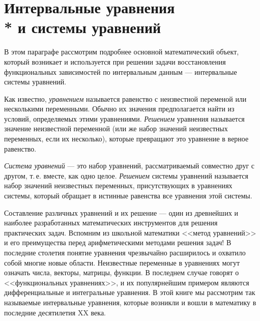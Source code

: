 \documentclass[a5paper,openany]{book}
\begin{document}
  
\section[Интервальные уравнения и системы уравнений]%
        {Интервальные уравнения\\* и системы уравнений} 
\label{InteSystemSect} 
  
В этом параграфе рассмотрим подробнее основной математический объект, который 
возникает и используется при решении задачи восстановления функциональных зависимостей 
по интервальным данным --- интервальные системы уравнений. 
  
Как известно, \emph{уравнением} называется равенство с неизвестной переменой или 
несколькими переменными. Обычно их значения предполагается найти из условий, определяемых 
этими уравнениями. \emph{Решением} уравнения называется значение неизвестной переменной 
(или же набор значений неизвестных переменных, если их несколько), которые превращают 
это уравнение в верное равенство. 
  
\emph{Система уравнений} --- это набор уравнений, рассматриваемый 
совместно друг с другом, т.\,е. вместе, как одно целое. \emph{Решением} системы уравнений 
называется набор значений неизвестных переменных, присутствующих в уравнениях системы,
который обращает в истинные равенства все уравнения этой системы. 
  
Составление различных уравнений и их решение --- один из древнейших и наиболее 
разработанных математических инструментов для решения практических задач. Вспомним 
из школьной математики <<метод уравнений>> и его преимущества перед арифметическими 
методами решения задач! В последние столетия понятие уравнения чрезвычайно расширилось 
и охватило собой многие новые области. Неизвестные переменные в уравнениях могут 
означать числа, векторы, матрицы, функции. В последнем случае говорят о <<функциональных 
уравнениях>>, и их популярнейшим примером являются дифференциальные и интегральные 
уравнения. В этой книге мы рассмотрим так называемые интервальные уравнения, которые 
возникли и вошли в математику в последние десятилетия XX века. 
  
\end{document}
